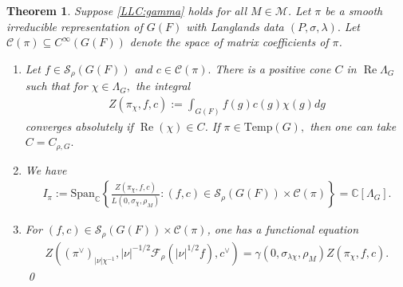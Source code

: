 \documentclass[10pt]{amsart}
\newtheorem{theorem}{Theorem}[section]
\theoremstyle{definition}
\numberwithin{equation}{section}
\numberwithin{equation}{subsection}
\newcommand{\CC}{\mathbb{C}}
\renewcommand{\Re}{\mathop{\mathrm{Re}}}
\begin{document}
\begin{theorem}\label{thm:gcd}
    Suppose \eqref{LLC:gamma} holds for all $M\in \mathcal{M}$. Let $\pi$ be a smooth irreducible  representation of $G(F)$ with Langlands data $(P,\sigma,\lambda).$ Let $\mathcal{C}(\pi)\subseteq C^\infty(G(F))$ denote the space of matrix coefficients of $\pi$. 
    \begin{enumerate}
        \item Let $f\in \mathcal{S}_\rho(G(F))$ and $c\in\mathcal{C}(\pi).$ There is a positive cone $C$ in $\Re \Lambda_G$ such that for $\chi\in \Lambda_G,$ the integral
    \begin{align*}
        Z(\pi_\chi,f,c):= \int_{G(F)} f(g)c(g)\chi(g)dg
    \end{align*}
    converges absolutely if $\Re(\chi)\in C$. If $\pi\in \mathrm{Temp}(G),$ then one can take $C=C_{\rho,G}.$
        \item We have
        \begin{align*}
            I_\pi:=\mathrm{Span}_\CC \left\{\frac{Z(\pi_\chi,f,c)}{L(0,\sigma_\chi,\rho_M)}: (f,c)\in \mathcal{S}_\rho(G(F))\times\mathcal{C}(\pi)\right\}=\CC[\Lambda_G].
        \end{align*}
        \item For $(f,c)\in\mathcal{S}_\rho(G(F))\times\mathcal{C}(\pi)$, one has a functional equation
        \begin{align*}
            Z((\pi^\lor)_{|\nu|\chi^{-1}},|\nu|^{-1/2}\mathcal{F}_\rho (|\nu|^{1/2}f),c^\vee)=\gamma(0,\sigma_{\lambda\chi},\rho_M)Z(\pi_\chi,f,c).
        \end{align*}\qed
    \end{enumerate}
\end{theorem}
\end{document}
